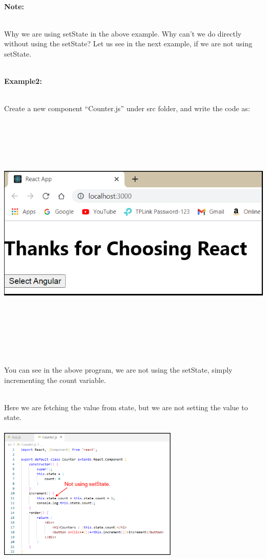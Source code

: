 \documentclass{article}
\begin{document}
\noindent 

\noindent \\
\textbf{Note:}

\noindent \\
Why we are using setState in the above example. Why can't we do directly without using the setState? Let us see in the next example, if we are not using setState.

\noindent 

\noindent \\
\textbf{Example2:}

\noindent \\
Create a new component ``Counter.js'' under src folder, and write the code as:

\begin{center}
	\noindent \includegraphics*[width=6.22in, height=4.54in]{IMG-09-33}
\end{center}

\noindent 

\noindent \\
You can see in the above program, we are not using the setState, simply incrementing the count variable.

\noindent 

\noindent \\
Here we are fetching the value from state, but we are not setting the value to state.


\begin{center}
	\noindent \includegraphics*[width=3.38in, height=2.59in]{IMG-09-34}
\end{center}
\end{document}
